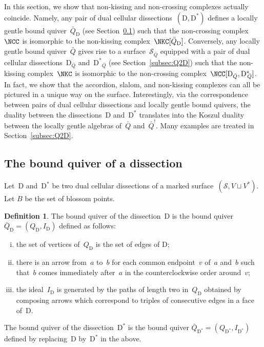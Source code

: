 \documentclass{amsart}
\theoremstyle{definition}
\newtheorem{definition}[theorem]{Definition}
\newcommand{\surface}{\mathcal{S}} %
\newcommand{\dual}{^*} %
\newcommand{\dissection}{\mathrm{D}} %
\newcommand{\koszul}{^!} %
\begin{document}
In this section, we show that non-kissing and non-crossing complexes actually coincide.
Namely, any pair of dual cellular dissections~$(\dissection, \dissection\dual)$ defines a locally gentle bound quiver~$\bar Q_{\dissection}$ (see Section~\ref{subsec:D2Q}) such that the non-crossing complex~$\NCC$ is isomorphic to the non-kissing complex~$\NKC[\bar Q_{\dissection}]$.
Conversely, any locally gentle bound quiver~$\bar Q$ gives rise to a surface~$\surface_{\bar Q}$ equipped with a pair of dual cellular dissections~$\dissection_{\bar Q}$ and~${{\dissection\dual}\!\!_{\bar Q}}$ (see Section~\ref{subsec:Q2D}) such that the non-kissing complex~$\NKC$ is isomorphic to the non-crossing complex~$\NCC[\dissection_{\bar Q}, {\dissection\dual\!\!_{\bar Q}}]$.
In fact, we show that the accordion, slalom, and non-kissing complexes can all be pictured in a unique way on the surface.
Interestingly, via the correspondence between pairs of dual cellular dissections and locally gentle bound quivers, the duality between the dissections~$\dissection$ and~$\dissection\dual$ translates into the Koszul duality between the locally gentle algebras of~$\bar Q$ and~$\bar Q\koszul$.
Many examples are treated in Section~\ref{subsec:Q2D}.

\subsection{The bound quiver of a dissection}
\label{subsec:D2Q}

Let~$\dissection$ and~$\dissection\dual$ be two dual cellular dissections of a marked surface~$(\surface, V\sqcup V\dual)$.
Let $B$ be the set of blossom points.

\begin{definition}
\label{def:quiverDualDissections}
The bound quiver of the dissection~$\dissection$ is the bound quiver $\bar Q_{\dissection} = (Q_{\dissection}, I_{\dissection})$ defined as follows:
\begin{enumerate}[(i)]
\item the set of vertices of~$Q_{\dissection}$ is the set of edges of $\dissection$;
\item there is an arrow from~$a$ to~$b$ for each common endpoint~$v$ of~$a$ and~$b$ such that~$b$ comes immediately after~$a$ in the counterclockwise order around~$v$;
\item the ideal~$I_{\dissection}$ is generated by the paths of length two in~$Q_{\dissection}$ obtained by composing arrows which correspond to triples of consecutive edges in a face of~$\dissection$.
\end{enumerate}
The bound quiver of the dissection~$\dissection\dual$ is the bound quiver $\bar Q_{\dissection\dual} = (Q_{\dissection\dual}, I_{\dissection\dual})$ defined by replacing~$\dissection$ by~$\dissection\dual$ in the above.
\end{definition}
\end{document}
